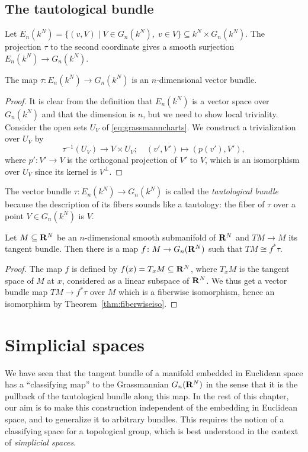 \documentclass[a4paper,openany]{scrbook}
\begin{document}
\subsection{The tautological bundle}

Let $E_n(k^N) = \{ (v,V) \mid V \in G_n(k^N), \; v \in V \} \subseteq k^N \times G_n(k^N)$. The projection $\tau$ to the second coordinate gives a smooth surjection $E_n(k^N) \to G_n(k^N)$.

\begin{prop}
The map $\tau\colon E_n(k^N) \to G_n(k^N)$ is an $n$-dimensional vector bundle.
\end{prop}
\begin{proof}
It is clear from the definition that $E_n(k^N)$ is a vector space over $G_n(k^N)$ and that the dimension is $n$, but we need to show local triviality. Consider the open sets $U_V$ of \eqref{eq:grassmanncharts}. We construct a trivialization over $U_V$ by
\[
\tau^{-1}(U_V) \to V \times U_V; \quad (v',V') \mapsto (p(v'),V'),
\]
where $p'\colon V' \to V$ is the orthogonal projection of $V'$ to $V$, which is an isomorphism over $U_V$ since its kernel is $V^\perp$.
\end{proof}

The vector bundle $\tau\colon E_n(k^N) \to G_n(k^N)$ is called the \emph{tautological bundle} because the description of its fibers sounds like a tautology: the fiber of $\tau$ over a point $V \in G_n(k^N)$ is $V$.

\begin{thm}
Let $M \subseteq \mathbf R^N$ be an $n$-dimensional smooth submanifold of $\mathbf R^N$ and $TM \to M$ its tangent bundle. Then there is a map $f\colon M \to G_n(\mathbf R^N)$ such that $TM \cong f^*\tau$.
\end{thm}
\begin{proof}
The map $f$ is defined by $f(x) = T_xM \subseteq \mathbf R^N$, where $T_xM$ is the tangent space of $M$ at $x$, considered as a linear subspace of $\mathbf R^N$. We thus get a vector bundle map $TM \to f^*\tau$ over $M$ which is a fiberwise isomorphism, hence an isomorphism by Theorem~\ref{thm:fiberwiseiso}.
\end{proof}

\section{Simplicial spaces}\label{sec:simplicial-spaces}

We have seen that the tangent bundle of a manifold embedded in Euclidean space has a “classifying map” to the Grassmannian $G_n(\mathbf R^N)$ in the sense that it is the pullback of the tautological bundle along this map. In the rest of this chapter, our aim is to make this construction independent of the embedding in Euclidean space, and to generalize it to arbitrary bundles. This requires the notion of a classifying space for a topological group, which is best understood in the context of \emph{simplicial spaces}.
\end{document}
